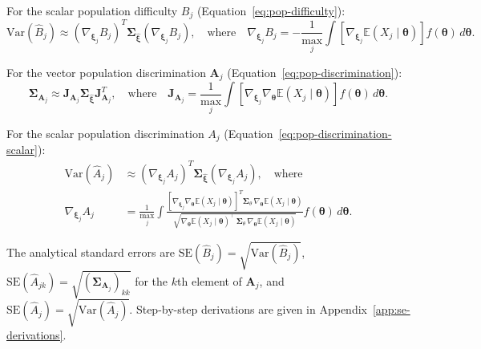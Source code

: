 \documentclass[man, 12pt, floatsintext]{apa7}
\begin{document}
For the scalar population difficulty $B_j$ (Equation~\ref{eq:pop-difficulty}):
$$\text{Var}(\hat{B}_j) \approx \left(\nabla_{\boldsymbol{\xi}_j} B_j\right)^T \mathbf{\Sigma}_{\hat{\boldsymbol{\xi}}} \left(\nabla_{\boldsymbol{\xi}_j} B_j\right), \quad \text{where} \quad \nabla_{\boldsymbol{\xi}_j} B_j = -\frac{1}{\max_j} \int \left[ \nabla_{\boldsymbol{\xi}_j}\mathbb{E}(X_j \mid \boldsymbol{\theta})\right] f(\boldsymbol{\theta})\, d\boldsymbol{\theta}.$$

For the vector population discrimination $\mathbf{A}_j$ (Equation~\ref{eq:pop-discrimination}):
$$\mathbf{\Sigma}_{\mathbf{A}_j} \approx \mathbf{J}_{\mathbf{A}_j} \mathbf{\Sigma}_{\hat{\boldsymbol{\xi}}} \mathbf{J}_{\mathbf{A}_j}^T, \quad \text{where} \quad \mathbf{J}_{\mathbf{A}_j} = \frac{1}{\max_j} \int \left[ \nabla_{\boldsymbol{\xi}_j}\nabla_{\boldsymbol{\theta}} \mathbb{E}(X_j \mid \boldsymbol{\theta}) \right] f(\boldsymbol{\theta})\, d\boldsymbol{\theta}.$$

For the scalar population discrimination $A_j$ (Equation~\ref{eq:pop-discrimination-scalar}):
$$
\begin{aligned}
\text{Var}(\hat{A}_j) &\approx \left(\nabla_{\boldsymbol{\xi}_j} A_j\right)^T \mathbf{\Sigma}_{\hat{\boldsymbol{\xi}}} \left(\nabla_{\boldsymbol{\xi}_j} A_j\right), \quad \text{where} \\
\nabla_{\boldsymbol{\xi}_j} A_j &= \frac{1}{\max_j} \int \frac{\left[\nabla_{\boldsymbol{\xi}_j}\nabla_{\boldsymbol{\theta}} \mathbb{E}(X_j \mid \boldsymbol{\theta})\right]^T \boldsymbol{\Sigma}_\theta\, \nabla_{\boldsymbol{\theta}}\mathbb{E}(X_j \mid \boldsymbol{\theta})}{\sqrt{\nabla_{\boldsymbol{\theta}}\mathbb{E}(X_j \mid \boldsymbol{\theta})^{\top}\,\boldsymbol{\Sigma}_\theta\,\nabla_{\boldsymbol{\theta}}\mathbb{E}(X_j \mid \boldsymbol{\theta})}} f(\boldsymbol{\theta})\, d\boldsymbol{\theta}.
\end{aligned}
$$

The analytical standard errors are $\text{SE}(\hat{B}_j) = \sqrt{\text{Var}(\hat{B}_j)}$, $\text{SE}(\hat{A}_{jk}) = \sqrt{(\mathbf{\Sigma}_{\mathbf{A}_j})_{kk}}$ for the $k$th element of $\mathbf{A}_j$, and $\text{SE}(\hat{A}_j) = \sqrt{\text{Var}(\hat{A}_j)}$. Step-by-step derivations are given in Appendix~\ref{app:se-derivations}.
\end{document}
